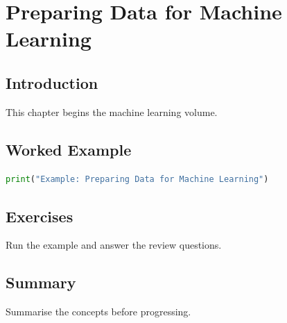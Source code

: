 \chapter{Preparing Data for Machine Learning}
\label{chap:vol6-3}



\section{Introduction}
This chapter begins the machine learning volume.

\section{Worked Example}
\begin{lstlisting}[language=Python]
print("Example: Preparing Data for Machine Learning")
\end{lstlisting}

\section{Exercises}
\begin{exercise}
Run the example and answer the review questions.
\end{exercise}

\section{Summary}
Summarise the concepts before progressing.
